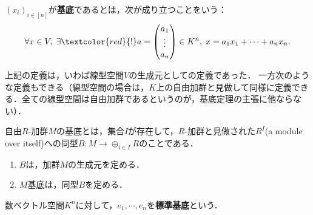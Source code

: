 \documentclass[uplatex, dvipdfmx]{jsreport}
\begin{document}
\begin{definition}[basis]
    $(x_i)_{i\in [n]}$が\textbf{基底}であるとは，次が成り立つことをいう：
    \[ \forall x\in V,\; \exists\textcolor{red}{!} a=\begin{pmatrix}a_1\\\vdots\\a_n\end{pmatrix}\in K^n,\; x=a_1x_1+\cdots+a_nx_n. \]
\end{definition}
\begin{remark}[圏論的な基底の定義]
    上記の定義は，いわば線型空間$V$の生成元としての定義であった．
    一方次のような定義もできる（線型空間の場合は，$K$上の自由加群と見做して同様に定義できる．全ての線型空間は自由加群であるというのが，基底定理の主張に他ならない）．

    自由$R$-加群$M$の基底とは，集合$I$が存在して，$R$-加群と見做された$R^I$(a module over itself)への同型$B:M\to\oplus_{i\in I}R$のことである．
\end{remark}
\begin{proposition}[基底の特徴付け１]\mbox{}
    \begin{enumerate}
        \item $B$は，加群$M$の生成元を定める．
        \item $M$基底は，同型$B$を定める．
    \end{enumerate}
\end{proposition}

\begin{definition}
    数ベクトル空間$K^n$に対して，$e_1,\cdots,e_n$を\textbf{標準基底}という．
\end{definition}
\end{document}
